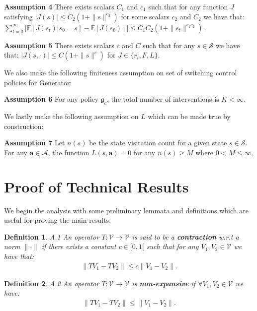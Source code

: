 \documentclass{article}
\newtheorem{definition}{Definition}
\begin{document}
\textbf{Assumption 4}
There exists scalars $C_1$ and $c_1$ such that for any function $J$ satisfying $|J(s)|\leq C_2(1+\|s\|^{c_2})$ for some scalars $c_2$ and $C_2$ we have that: $
    \sum_{t=0}^\infty\left|\mathbb{E}\left[J(s_t)|s_0=s\right]-\mathbb{E}[J(s_0)]\right|\leq C_1C_2(1+\|s_t\|^{c_1c_2})$.

\textbf{Assumption 5}
There exists scalars $c$ and $C$ such that for any $s\in\mathcal{S}$ we have that: $
    |J(s,\cdot)|\leq C(1+\|s\|^c)$ for $J\in \{r_i,F,L\}$.

We also make the following finiteness assumption on set of switching control policies for {\selectfont Generator}:

\textbf{Assumption 6}
For any policy $\mathfrak{g}_c$, the total number of interventions is $K<\infty$.

We lastly make the following assumption on $L$ which can be made true by construction:

\textbf{Assumption 7}
Let $n(s)$ be the state visitation count for a given state $s\in\mathcal{S}$. For any $\boldsymbol{a}\in\boldsymbol{\mathcal{A}}$, the function $L(s,\boldsymbol{a})= 0$ for any $n(s)\geq M$ where $0<M\leq \infty$.

\clearpage
\section{Proof of Technical Results}\label{sec:proofs_appendix}


We begin the analysis with some preliminary lemmata and definitions which are useful for proving the main results.

\begin{definition}{A.1}
An operator $T: \mathcal{V}\to \mathcal{V}$ is said to be a \textbf{contraction} w.r.t a norm $\|\cdot\|$ if there exists a constant $c\in[0,1[$ such that for any $V_1,V_2\in  \mathcal{V}$ we have that:
\begin{align}
    \|TV_1-TV_2\|\leq c\|V_1-V_2\|.
\end{align}
\end{definition}

\begin{definition}{A.2}
An operator $T: \mathcal{V}\to  \mathcal{V}$ is \textbf{non-expansive} if $\forall V_1,V_2\in  \mathcal{V}$ we have:
\begin{align}
    \|TV_1-TV_2\|\leq \|V_1-V_2\|.
\end{align}
\end{definition}
\end{document}
